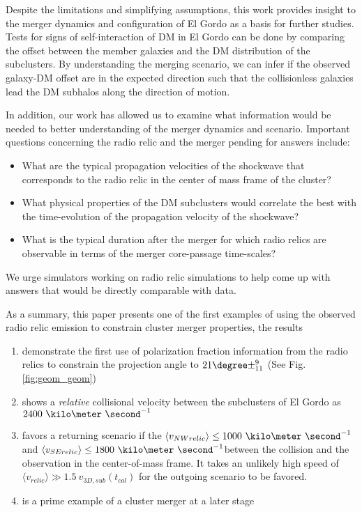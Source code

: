 Despite the limitations and simplifying assumptions, this work provides
insight to the merger dynamics and configuration of El Gordo as a basis for further studies.
Tests for signs of self-interaction of DM in El Gordo can be done
by comparing the offset between the member galaxies and the
DM distribution of the subclusters. By understanding the merging scenario,
we can infer if the observed galaxy-DM offset are in the expected
direction such that the collisionless galaxies lead the DM subhalos along
the direction of motion. \par 
In addition, our work has allowed us to examine
what information would be needed to better understanding of the merger
dynamics and scenario. Important questions concerning the radio
relic and the merger pending for answers include:  
\begin{itemize}
\item What are the typical propagation velocities of the shockwave that
corresponds to the radio relic in the	center of mass frame of the cluster?
\item What physical properties of the DM subclusters would correlate the
	best with the time-evolution of the propagation velocity of the shockwave?  
\item What is the typical duration
after the merger for which radio relics are observable in terms of the merger
core-passage time-scales? 
\end{itemize}
We urge simulators working on radio relic
simulations to help come up with answers that would be directly
comparable with data. \par 

As a summary, this paper presents one of the first examples of using the
observed radio relic emission to constrain cluster merger properties, the
results
\begin{enumerate}
	\item demonstrate the first use of polarization fraction information from
		the radio relics to constrain the projection angle to $21 \degree
		\pm^{9}_{11}$ (See	Fig. \ref{fig:geom_geom})\\ 
	\item 
		shows a {\it relative} collisional velocity between the subclusters of El
		Gordo as $2400~\kilo\meter~\second^{-1}$ \\ 
	\item favors a returning scenario if the $\langle v_{NW relic}\rangle \leq
		1000~\kilo
		\meter~\second^{-1}$ and $\langle v_{SE relic}\rangle \leq
		1800~\kilo\meter~\second^{-1}$between the collision and the observation in the
		center-of-mass frame. It takes
		an unlikely high speed of $\langle v_{relic} \rangle \gg 1.5~v_{3D,
		sub}(t_{col})$ for the outgoing scenario to be favored.  
	\item is a prime example of a cluster merger at a later stage  
\end{enumerate}

